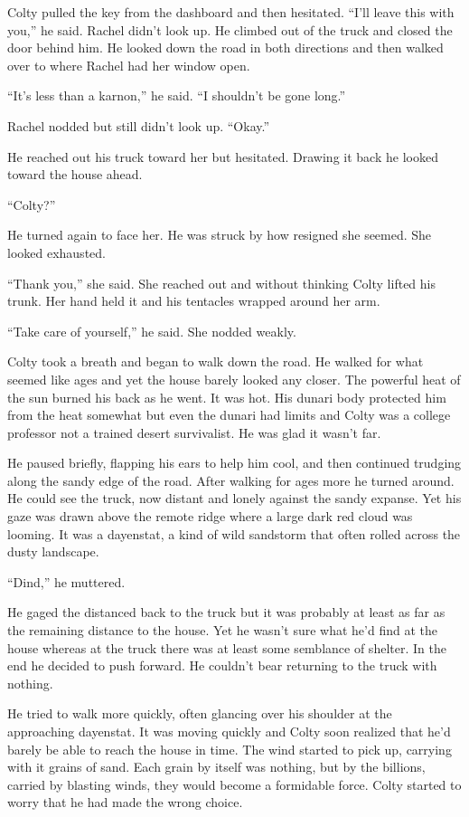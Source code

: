 Colty pulled the key from the dashboard and then hesitated. ``I'll leave this with you,'' he
said. Rachel didn't look up. He climbed out of the truck and closed the door behind him. He
looked down the road in both directions and then walked over to where Rachel had her window
open.

``It's less than a karnon,'' he said. ``I shouldn't be gone long.''

Rachel nodded but still didn't look up. ``Okay.''

He reached out his truck toward her but hesitated. Drawing it back he looked toward the house
ahead.

``Colty?''

He turned again to face her. He was struck by how resigned she seemed. She looked exhausted.

``Thank you,'' she said. She reached out and without thinking Colty lifted his trunk. Her hand
held it and his tentacles wrapped around her arm.

``Take care of yourself,'' he said. She nodded weakly.

Colty took a breath and began to walk down the road. He walked for what seemed like ages and yet
the house barely looked any closer. The powerful heat of the sun burned his back as he went. It
was hot. His dunari body protected him from the heat somewhat but even the dunari had limits and
Colty was a college professor not a trained desert survivalist. He was glad it wasn't far.

He paused briefly, flapping his ears to help him cool, and then continued trudging along the
sandy edge of the road. After walking for ages more he turned around. He could see the truck,
now distant and lonely against the sandy expanse. Yet his gaze was drawn above the remote ridge
where a large dark red cloud was looming. It was a dayenstat, a kind of wild sandstorm that
often rolled across the dusty landscape.

``Dind,'' he muttered.

He gaged the distanced back to the truck but it was probably at least as far as the remaining
distance to the house. Yet he wasn't sure what he'd find at the house whereas at the truck there
was at least some semblance of shelter. In the end he decided to push forward. He couldn't bear
returning to the truck with nothing.

He tried to walk more quickly, often glancing over his shoulder at the approaching dayenstat. It
was moving quickly and Colty soon realized that he'd barely be able to reach the house in time.
The wind started to pick up, carrying with it grains of sand. Each grain by itself was nothing,
but by the billions, carried by blasting winds, they would become a formidable force. Colty
started to worry that he had made the wrong choice.

